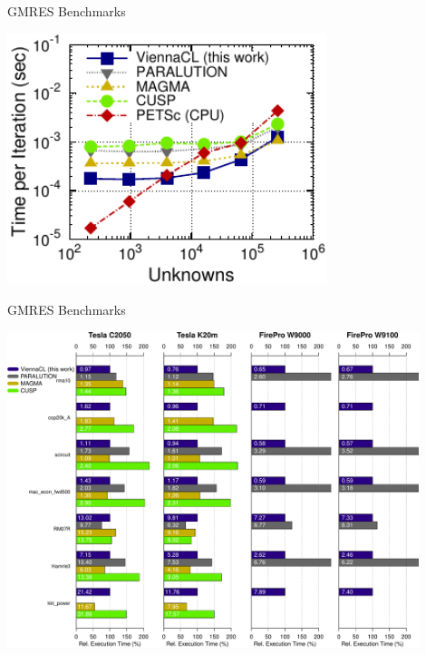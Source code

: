 \begin{frame}[fragile]{GMRES Benchmarks}
 \begin{block}{}
 \begin{center}
  \includegraphics[width=0.7\textwidth]{figures/time-laplace2d-K20m-gmres}
 \end{center}
 \end{block}   
\end{frame}

\begin{frame}[fragile]{GMRES Benchmarks}
 \begin{block}{}
 \begin{center}
  \vspace*{-1cm}
  \includegraphics[width=0.9\textwidth]{figures/gmres}
 \end{center}
 \end{block}   
\end{frame}


